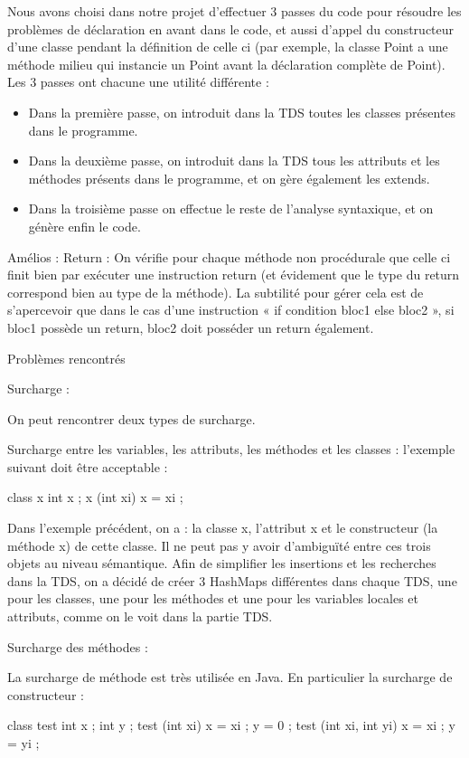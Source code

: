 Nous avons choisi dans notre projet d'effectuer 3 passes du code pour résoudre les problèmes de déclaration en avant dans le code, et aussi
d'appel du constructeur d'une classe pendant la définition de celle ci (par exemple, la classe Point a une méthode milieu qui instancie un Point
avant la déclaration complète de Point). 
Les 3 passes ont chacune une utilité différente : 
\begin{itemize}
 \item Dans la première passe, on introduit dans la TDS toutes les classes présentes dans le programme.
 \item Dans la deuxième passe, on introduit dans la TDS tous les attributs et les méthodes présents dans le programme, et on gère également les extends.
 \item Dans la troisième passe on effectue le reste de l'analyse syntaxique, et on génère enfin le code.
\end{itemize}


Amélios :
Return :
On vérifie pour chaque méthode non procédurale que celle ci finit bien par
exécuter une instruction return (et évidement que le type du return correspond
bien au type de la méthode). La subtilité pour gérer cela est de s'apercevoir
que dans le cas d'une instruction « if condition {bloc1} else {bloc2} », si
bloc1 possède un return, bloc2 doit posséder un return également.


Problèmes rencontrés

Surcharge :

On peut rencontrer deux types de surcharge.

Surcharge entre les variables, les attributs, les méthodes et les classes :
l'exemple suivant doit être acceptable :

class x {
  int x ;
  x (int xi) {
    x = xi ;
  }
}

Dans l'exemple précédent, on a : la classe x, l'attribut x et le constructeur
(la méthode x) de cette classe. Il ne peut pas y avoir d’ambiguïté entre ces
trois objets au niveau sémantique. Afin de simplifier les insertions et les
recherches dans la TDS, on a décidé de créer 3 HashMaps différentes dans chaque
TDS, une pour les classes, une pour les méthodes et une pour les variables
locales et attributs, comme on le voit dans la partie TDS.


Surcharge des méthodes :

La surcharge de méthode est très utilisée en Java. En particulier la surcharge de constructeur :

class test {
   int x ;
   int y ;
   test (int xi) {
     x = xi ;
     y = 0 ;
   }
   test (int xi, int yi) {
     x = xi ;
     y = yi ;
   }
}


